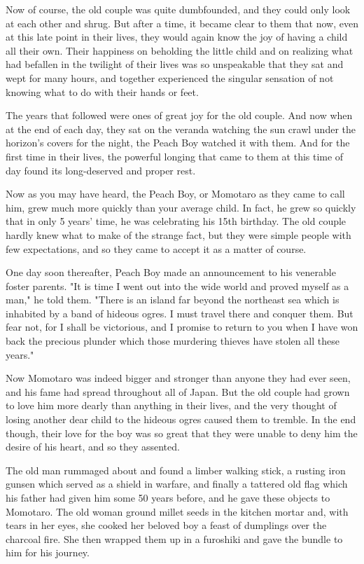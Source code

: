 Now of course, the old couple was quite dumbfounded, and they could only look at each other and shrug. But after a time, it became clear to them that now, even at this late point in their lives, they would again know the joy of having a child all their own. Their happiness on beholding the little child and on realizing what had befallen in the twilight of their lives was so unspeakable that they sat and wept for many hours, and together experienced the singular sensation of not knowing what to do with their hands or feet.

The years that followed were ones of great joy for the old couple. And now when at the end of each day, they sat on the veranda watching the sun crawl under the horizon's covers for the night, the Peach Boy watched it with them. And for the first time in their lives, the powerful longing that came to them at this time of day found its long-deserved and proper rest.

Now as you may have heard, the Peach Boy, or Momotaro as they came to call him, grew much more quickly than your average child. In fact, he grew so quickly that in only 5 years' time, he was celebrating his 15th birthday. The old couple hardly knew what to make of the strange fact, but they were simple people with few expectations, and so they came to accept it as a matter of course.

One day soon thereafter, Peach Boy made an announcement to his venerable foster parents. "It is time I went out into the wide world and proved myself as a man," he told them. "There is an island far beyond the northeast sea which is inhabited by a band of hideous ogres. I must travel there and conquer them. But fear not, for I shall be victorious, and I promise to return to you when I have won back the precious plunder which those murdering thieves have stolen all these years."

Now Momotaro was indeed bigger and stronger than anyone they had ever seen, and his fame had spread throughout all of Japan. But the old couple had grown to love him more dearly than anything in their lives, and the very thought of losing another dear child to the hideous ogres caused them to tremble. In the end though, their love for the boy was so great that they were unable to deny him the desire of his heart, and so they assented.

The old man rummaged about and found a limber walking stick, a rusting iron gunsen which served as a shield in warfare, and finally a tattered old flag which his father had given him some 50 years before, and he gave these objects to Momotaro. The old woman ground millet seeds in the kitchen mortar and, with tears in her eyes, she cooked her beloved boy a feast of dumplings over the charcoal fire. She then wrapped them up in a furoshiki and gave the bundle to him for his journey.

